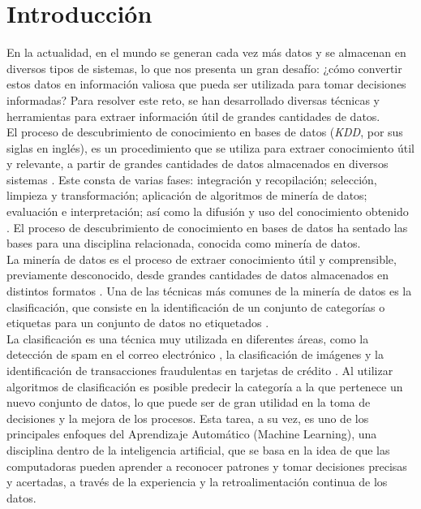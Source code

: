 \chapter*{Introducción}
En la actualidad, en el mundo se generan cada vez más datos y se almacenan en diversos tipos de sistemas, lo que nos presenta un gran desafío: ¿cómo convertir estos datos en información valiosa que pueda ser utilizada para tomar decisiones informadas? Para resolver este reto, se han desarrollado diversas técnicas y herramientas para extraer información útil de grandes cantidades de datos. \\
El proceso de descubrimiento de conocimiento en bases de datos (\textit{KDD}, por sus siglas en inglés), es un procedimiento que se utiliza para extraer conocimiento útil y relevante, a partir de grandes cantidades de datos almacenados en diversos sistemas \citep{orallo2004}. Este consta de varias fases: integración y recopilación; selección, limpieza y transformación; aplicación de algoritmos de minería de datos; evaluación e interpretación; así como la difusión y uso del conocimiento obtenido \citep{Han2011}. El proceso de descubrimiento de conocimiento en bases de datos ha sentado las bases para una disciplina relacionada, conocida como minería de datos. \\
La minería de datos es el proceso de extraer conocimiento útil y comprensible, previamente desconocido, desde grandes cantidades de datos almacenados en distintos formatos \citep{orallo2004}. Una de las técnicas más comunes de la minería de datos es la clasificación, que consiste en la identificación de un conjunto de categorías o etiquetas para un conjunto de datos no etiquetados \citep{orallo2004}. \\
La clasificación es una técnica muy utilizada en diferentes áreas, como la detección de spam en el correo electrónico \citep{mendez2007sistemas}, la clasificación de imágenes \citep{borras2017clasificacion} y la identificación de transacciones fraudulentas en tarjetas de crédito \citep{dhankhad2018supervised}. Al utilizar algoritmos de clasificación es posible predecir la categoría a la que pertenece un nuevo conjunto de datos, lo que puede ser de gran utilidad en la toma de decisiones y la mejora de los procesos. Esta tarea, a su vez, es uno de los principales enfoques del Aprendizaje Automático (Machine Learning), una disciplina dentro de la inteligencia artificial, que se basa en la idea de que las computadoras pueden aprender a reconocer patrones y tomar decisiones precisas y acertadas, a través de la experiencia y la retroalimentación continua de los datos. \\
